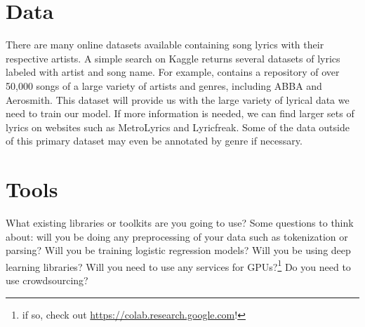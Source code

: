 \documentclass[11pt,a4paper]{article}
\begin{document}
\section{Data}
There are many online datasets available containing song lyrics with their respective artists. A simple search on Kaggle returns several datasets of lyrics labeled with artist and song name. For example,  contains a repository of over 50,000 songs of a large variety of artists and genres, including ABBA and Aerosmith. This dataset will provide us with the large variety of lyrical data we need to train our model. If more information is needed, we can find larger sets of lyrics on websites such as MetroLyrics and Lyricfreak. Some of the data outside of this primary dataset may even be annotated by genre if necessary.

\section{Tools}
What existing libraries or toolkits are you going to use? 
Some questions to think about: will you be doing any preprocessing of your data such as tokenization or parsing? 
Will you be training logistic regression models? Will you be using deep learning libraries? 
Will you need to use any services for GPUs?\footnote{if so, check out \url{https://colab.research.google.com}!} 
Do you need to use crowdsourcing?


\footnotesize

\end{document}
